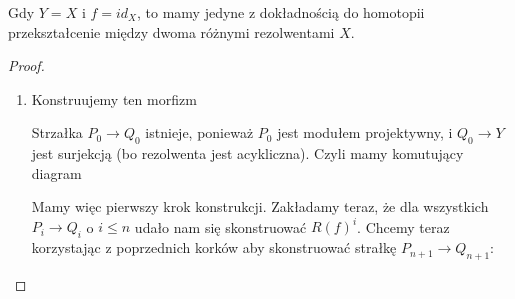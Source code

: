 \begin{conclusion}
  Gdy $Y=X$ i $f=id_X$, to mamy jedyne z dokładnością do homotopii przekształcenie między dwoma różnymi rezolwentami $X$.

  \begin{center}\end{center}
\end{conclusion}

\begin{proof}
  \begin{enumerate}[label=(\alph*)]
    \item Konstruujemy ten morfizm 
      \begin{center}\end{center}
      Strzałka $P_0\to Q_0$ istnieje, ponieważ $P_0$ jest modułem projektywny, i $Q_0\to Y$ jest surjekcją (bo rezolwenta jest acykliczna). Czyli mamy komutujący diagram
      \begin{center}\end{center}
  Mamy więc pierwszy krok konstrukcji. Zakładamy teraz, że dla wszystkich $P_i\to Q_i$ o $i\leq n$ udało nam się skonstruować $R(f)^i$. Chcemy teraz korzystając z poprzednich korków aby skonstruować strałkę $P_{n+1}\to Q_{n+1}$:
  \begin{center}\end{center}


\end{enumerate}
\end{proof}
